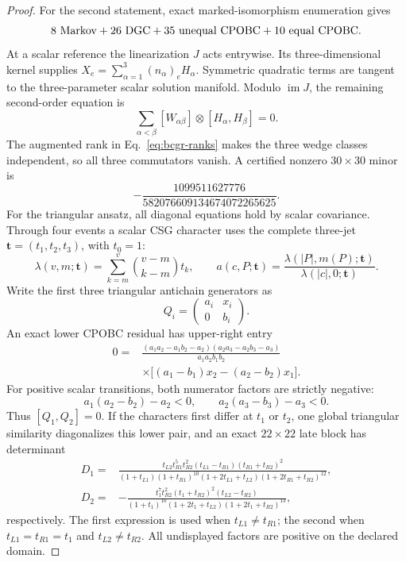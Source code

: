 \begin{proof}
For the second statement, exact marked-isomorphism enumeration gives
\[
 8\ {\rm Markov}+26\ {\rm DGC}
 +35\ {\rm unequal\ CPOBC}+10\ {\rm equal\ CPOBC}.
\]
At a scalar reference the linearization \(J\) acts entrywise.  Its
three-dimensional kernel supplies
\(X_e=\sum_{\alpha=1}^3(n_\alpha)_eH_\alpha\).  Symmetric quadratic terms
are tangent to the three-parameter scalar solution manifold.  Modulo
\(\operatorname{im}J\), the remaining second-order equation is
\[
 \sum_{\alpha<\beta}
 [W_{\alpha\beta}]\otimes[H_\alpha,H_\beta]=0.
\]
The augmented rank in Eq.~\eqref{eq:bcgr-ranks} makes the three wedge classes
independent, so all three commutators vanish.  A certified nonzero
\(30\times30\) minor is
\[
 -\frac{1099511627776}{582076609134674072265625}.
\]
For the triangular ansatz, all diagonal equations hold by scalar
covariance.  Through four events a scalar CSG character uses the complete
three-jet \(\bm t=(t_1,t_2,t_3)\), with \(t_0=1\):
\[
 \lambda(v,m;\bm t)
 =\sum_{k=m}^{v}\binom{v-m}{k-m}t_k,\qquad
 a(c,P;\bm t)
 =\frac{\lambda(|P|,m(P);\bm t)}
 {\lambda(|c|,0;\bm t)}.
\]
Write the first three triangular antichain generators as
\[
 Q_i=\begin{pmatrix}a_i&x_i\\0&b_i\end{pmatrix}.
\]
An exact lower CPOBC residual has upper-right entry
\begin{align}
0={}&
\frac{(a_1a_2-a_1b_2-a_2)(a_2a_3-a_2b_3-a_3)}
{a_1a_2b_1b_2}\nonumber\\
&\times\big[(a_1-b_1)x_2-(a_2-b_2)x_1\big].
\label{eq:bcgr-triangular-separator}
\end{align}
For positive scalar transitions, both numerator factors are strictly
negative:
\[
a_1(a_2-b_2)-a_2<0,\qquad
a_2(a_3-b_3)-a_3<0.
\]
Thus \([Q_1,Q_2]=0\).  If the characters first differ at \(t_1\) or
\(t_2\), one global triangular similarity diagonalizes this lower pair,
and an exact \(22\times22\) late block has determinant
\begin{align}
D_1={}&
\frac{t_{L2}t_{R1}^{5}t_{R2}^{2}
(t_{L1}-t_{R1})(t_{R1}+t_{R2})^2}
{(1+t_{L1})(1+t_{R1})^{10}
(1+2t_{L1}+t_{L2})(1+2t_{R1}+t_{R2})^{12}},
\label{eq:bcgr-minor-t1}\\
D_2={}&
-\frac{t_1^{7}t_{R2}^{2}(t_1+t_{R2})^2(t_{L2}-t_{R2})}
{(1+t_1)^{10}(1+2t_1+t_{L2})
(1+2t_1+t_{R2})^{13}},
\label{eq:bcgr-minor-t2}
\end{align}
respectively.  The first expression is used when
\(t_{L1}\ne t_{R1}\); the second when \(t_{L1}=t_{R1}=t_1\) and
\(t_{L2}\ne t_{R2}\).  All undisplayed factors are positive on the
declared domain.


\end{proof}
